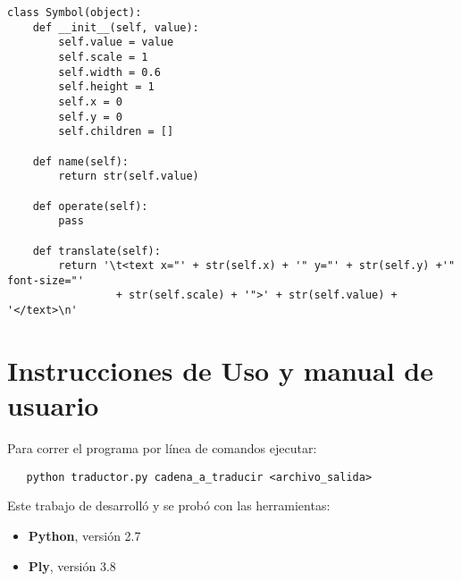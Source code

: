 \begin{verbatim}
class Symbol(object):
    def __init__(self, value):
        self.value = value
        self.scale = 1
        self.width = 0.6
        self.height = 1
        self.x = 0
        self.y = 0
        self.children = []

    def name(self):
        return str(self.value)

    def operate(self):
        pass

    def translate(self):
        return '\t<text x="' + str(self.x) + '" y="' + str(self.y) +'" font-size="' 
                 + str(self.scale) + '">' + str(self.value) + '</text>\n'
\end{verbatim}


\newpage

\section{Instrucciones de Uso y manual de usuario}

\indent \indent Para correr el programa por línea de comandos ejecutar:\\
\begin{verbatim}
   python traductor.py cadena_a_traducir <archivo_salida>
\end{verbatim}

\indent Este trabajo de desarrolló y se probó con las herramientas:
\begin{itemize}
\item \textbf{Python}, versión 2.7
\item \textbf{Ply}, versión 3.8
\end{itemize}



